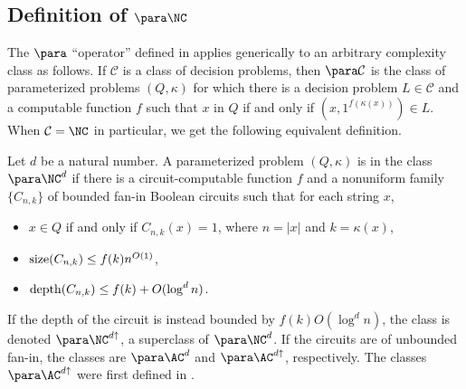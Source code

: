 \subsection{Definition of \texorpdfstring{$\para \NC$}{paraNC}}

%
%
%
%
%
%
%
%
%
%
%
%
%

%
%
%
%
%
%
%
%

The $\para$ ``operator'' defined in \autocite{fg03} applies generically to an arbitrary complexity class as follows.
If $\mathcal{C}$ is a class of decision problems, then $\para \mathcal{C}$ is the class of parameterized problems $(Q, \kappa)$ for which there is a decision problem $L \in \mathcal{C}$ and a computable function $f$ such that $x$ in $Q$ if and only if $(x, 1^{f(\kappa(x))}) \in L$.
When $\mathcal{C} = \NC$ in particular, we get the following equivalent definition.

\begin{definition}[$\para \NC^d$]
  Let $d$ be a natural number.
  A parameterized problem $(Q, \kappa)$ is in the class $\para \NC^d$ if there is a circuit-computable function $f$ and a nonuniform family $\{C_{n, k}\}$ of bounded fan-in Boolean circuits such that for each string $x$,
  \begin{itemize}
  \item $x \in Q$ if and only if $C_{n, k}(x) = 1$, where $n = |x|$ and $k = \kappa(x)$,
  \item $\operatorname{size}(C_{n, k}) \leq f(k) n^{O(1)}$,
  \item $\operatorname{depth}(C_{n, k}) \leq f(k) + O(\log^d n)$.
  \end{itemize}
\end{definition}

If the depth of the circuit is instead bounded by $f(k) O(\log^d n)$, the class is denoted $\para \NC^{d \uparrow}$, a superclass of $\para \NC^d$.
If the circuits are of unbounded fan-in, the classes are $\para \AC^d$ and $\para \AC^{d \uparrow}$, respectively.
The classes $\para \AC^{d \uparrow}$ were first defined in \autocite{bst15}.

